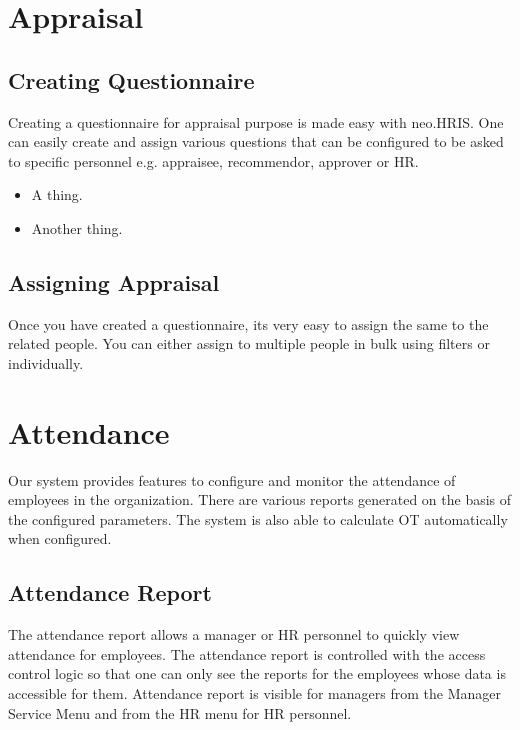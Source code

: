 \documentclass[letterpaper,10pt,english]{sphinxmanual}
\begin{document}
\chapter{Appraisal}
\label{\detokenize{appraisal/appraisal:appraisal}}\label{\detokenize{appraisal/appraisal::doc}}

\section{Creating Questionnaire}
\label{\detokenize{appraisal/add::doc}}\label{\detokenize{appraisal/add:creating-questionnaire}}
Creating a questionnaire for appraisal purpose is made easy with neo.HRIS. One can easily create and assign various questions that can be configured to be asked to specific personnel e.g. appraisee, recommendor, approver or HR.
\begin{itemize}
\item {} 
A thing.

\item {} 
Another thing.

\end{itemize}


\section{Assigning Appraisal}
\label{\detokenize{appraisal/view:assigning-appraisal}}\label{\detokenize{appraisal/view::doc}}
Once you have created a questionnaire, its very easy to assign the same to the related people. You can either assign to multiple people in bulk using filters or individually.


\chapter{Attendance}
\label{\detokenize{attendance/attendance:attendance}}\label{\detokenize{attendance/attendance::doc}}\label{\detokenize{attendance/attendance:id1}}
Our system provides features to configure and monitor the attendance of employees in the organization. There are various reports generated on the basis of the configured parameters. The system is also able to calculate OT automatically when configured.


\section{Attendance Report}
\label{\detokenize{attendance/report:attendance-report}}\label{\detokenize{attendance/report::doc}}\label{\detokenize{attendance/report:id1}}
The attendance report allows a manager or HR personnel to quickly view attendance for employees. The attendance report is controlled with the access control logic so that one can only see the reports for the employees whose data is accessible for them.
Attendance report is visible for managers from the Manager Service Menu and from the HR menu for HR personnel.
\end{document}
